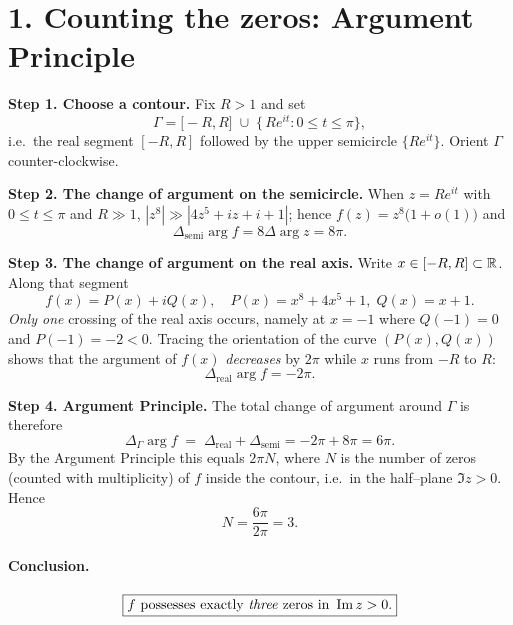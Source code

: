\documentclass[12pt]{article}
\theoremstyle{definition} %
\theoremstyle{plain} %
\begin{document}
%
%
\section*{1.  Counting the zeros: Argument Principle}

\medskip
\textbf{Step 1.  Choose a contour.}
Fix \(R>1\) and set  
\[
   \Gamma=\bigl[-R,R\bigr]\;\cup\;
           \bigl\{\,Re^{it}:0\le t\le\pi\bigr\},
\]
i.e.\ the real segment \([-R,R]\) followed by the upper semicircle
\(\{Re^{it}\}\).  
Orient \(\Gamma\) counter-clockwise.

\medskip
\textbf{Step 2.  The change of argument on the semicircle.}
When \(z=Re^{it}\) with \(0\le t\le\pi\) and \(R\gg1\),
\(|z^{8}|\gg|4z^{5}+iz+i+1|\); hence
\(f(z)=z^{8}\bigl(1+o(1)\bigr)\) and
\[
   \Delta_{\text{semi}}\!\arg f
   =8\Delta\arg z
   =8\pi .
\]

\medskip
\textbf{Step 3.  The change of argument on the real axis.}
Write \(x\in[-R,R]\subset\Bbb R\).  Along that segment
\[
   f(x)=P(x)+iQ(x),\quad
   P(x)=x^{8}+4x^{5}+1,\;
   Q(x)=x+1 .
\]
\emph{Only one} crossing of the real axis occurs, namely at
\(x=-1\) where \(Q(-1)=0\) and \(P(-1)=-2<0\).
Tracing the orientation of the curve
\((P(x),Q(x))\) shows that the argument of \(f(x)\)
\emph{decreases} by \(2\pi\) while $x$ runs from $-R$ to $R$:
\[
   \Delta_{\text{real}}\!\arg f=-2\pi .
\]

\medskip
\textbf{Step 4.  Argument Principle.}
The total change of argument around \(\Gamma\) is therefore
\[
   \Delta_{\Gamma}\!\arg f
   \;=\;\Delta_{\text{real}}+\Delta_{\text{semi}}
   =-2\pi+8\pi
   =6\pi .
\]
By the Argument Principle this equals \(2\pi N\), where
\(N\) is the number of zeros (counted with multiplicity) of \(f\)
inside the contour, i.e.\ in the half–plane \(\Im z>0\).
Hence
\[
   N=\frac{6\pi}{2\pi}=3 .
\]

\paragraph{Conclusion.}
\[
   \boxed{\text{$f$ possesses exactly \emph{three} zeros in }\Im z>0.}
\]
\end{document}
